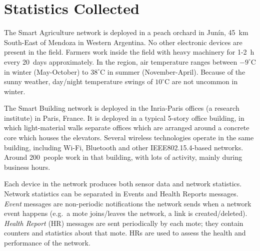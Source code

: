 \documentclass{elsarticle}
\newcommand{\building}            {Smart Building\xspace}
\newcommand{\agri}                {Smart Agriculture\xspace}
\begin{document}
\section{Statistics Collected}
\label{sec:collected}


The \agri network is deployed in a peach orchard in Jun\'in, 45~km South-East of Mendoza in Western Argentina.
No other electronic devices are present in the field.
Farmers work inside the field with heavy machinery for 1-2~h every 20~days approximately.
In the region, air temperature ranges between $-9^{\circ}$C in winter (May-October) to $38^{\circ}$C in summer (November-April).
Because of the sunny weather, day/night temperature swings of $10^{\circ}$C are not uncommon in winter.

The \building network is deployed in the Inria-Paris offices (a research institute) in Paris, France.
It is deployed in a typical 5-story office building, in which light-material walls separate offices which are arranged around a concrete core which houses the elevators.
Several wireless technologies operate in the same building, including Wi-Fi, Bluetooth and other IEEE802.15.4-based networks.
Around 200~people work in that building, with lots of activity, mainly during business hours.


Each device in the network produces both sensor data and network statistics.
Network statistics can be separated in Events and Health Reports messages.
\textit{Event} messages are non-periodic notifications the network sends when a network event happens (e.g.~a mote joins/leaves the network, a link is created/deleted).
\textit{Health Report} (HR) messages are sent periodically by each mote; they contain counters and statistics about that mote.
HRs are used to assess the health and performance of the network.

\end{document}

